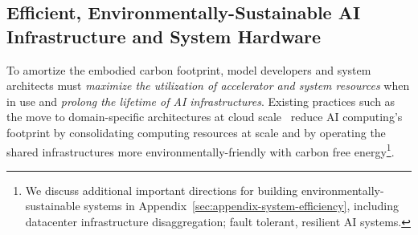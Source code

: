 \subsection{Efficient, Environmentally-Sustainable AI Infrastructure and System Hardware}
\label{sec:systems}

To amortize the embodied carbon footprint, model developers and system architects must \textit{maximize the utilization of accelerator and system resources} when in use and \textit{prolong the lifetime of AI infrastructures}. 
Existing practices such as the move to domain-specific architectures at cloud scale~\cite{Jouppi:isca:2017,AWS-inferentia,Microsoft-graphcore} reduce AI computing’s footprint by consolidating computing resources at scale and by operating the shared infrastructures more environmentally-friendly with carbon free energy\footnote{We discuss additional important directions for building environmentally-sustainable systems in Appendix~\ref{sec:appendix-system-efficiency}, including datacenter infrastructure disaggregation; fault tolerant, resilient AI systems.}. %


